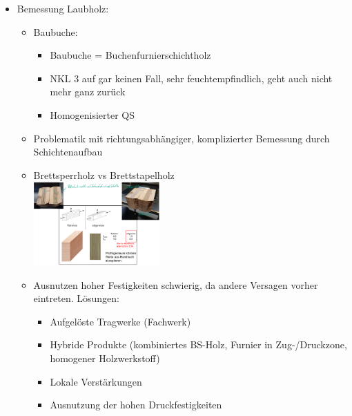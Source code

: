 \documentclass[fleqn,twoside]{article}
\begin{document}
\begin{itemize}
                \vspace*{3mm}
                \item Bemessung Laubholz:
                    \begin{itemize}
                        \item Baubuche: 
                            \begin{itemize}
                                \item Baubuche = Buchenfurnierschichtholz
                                \item NKL 3 auf gar keinen Fall, sehr feuchtempfindlich, geht auch nicht mehr ganz zurück
                                \item Homogenisierter QS
                            \end{itemize}
                                \item Problematik mit richtungsabhängiger, komplizierter Bemessung durch Schichtenaufbau
                                \item Brettsperrholz vs Brettstapelholz \\
                                    \includegraphics[width=0.4\textwidth]{Grafiken/Laubholz/Baubuche Brettsperr-Brettstapel.png}
                        \item Ausnutzen hoher Festigkeiten schwierig, da andere Versagen vorher eintreten. Lösungen:
                            \begin{itemize}
                                \item Aufgelöste Tragwerke (Fachwerk)
                                \item Hybride Produkte (kombiniertes BS-Holz, Furnier in Zug-/Druckzone, homogener Holzwerkstoff)
                                \item Lokale Verstärkungen
                                \item Ausnutzung der hohen Druckfestigkeiten
                            \end{itemize}
                    \end{itemize}
        \end{itemize}
\end{document}

